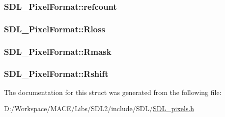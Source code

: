 \subsubsection[{\texorpdfstring{refcount}{refcount}}]{ S\+D\+L\+\_\+\+Pixel\+Format\+::refcount}\hypertarget{struct_s_d_l___pixel_format_a23be8060443d58064a720a4e2ef31729}{}\label{struct_s_d_l___pixel_format_a23be8060443d58064a720a4e2ef31729}
\subsubsection[{\texorpdfstring{Rloss}{Rloss}}]{ S\+D\+L\+\_\+\+Pixel\+Format\+::\+Rloss}\hypertarget{struct_s_d_l___pixel_format_a9994b4ed87a2551253aebfa191db8424}{}\label{struct_s_d_l___pixel_format_a9994b4ed87a2551253aebfa191db8424}
\subsubsection[{\texorpdfstring{Rmask}{Rmask}}]{ S\+D\+L\+\_\+\+Pixel\+Format\+::\+Rmask}\hypertarget{struct_s_d_l___pixel_format_a35e5793f6e9c356aec2d130167174946}{}\label{struct_s_d_l___pixel_format_a35e5793f6e9c356aec2d130167174946}
\subsubsection[{\texorpdfstring{Rshift}{Rshift}}]{ S\+D\+L\+\_\+\+Pixel\+Format\+::\+Rshift}\hypertarget{struct_s_d_l___pixel_format_abfdec7b9ee2ee39db630f4022e4e0daa}{}\label{struct_s_d_l___pixel_format_abfdec7b9ee2ee39db630f4022e4e0daa}


The documentation for this struct was generated from the following file\+:\begin{DoxyCompactItemize}
\item 
D\+:/\+Workspace/\+M\+A\+C\+E/\+Libs/\+S\+D\+L2/include/\+S\+D\+L/\hyperlink{_s_d_l__pixels_8h}{S\+D\+L\+\_\+pixels.\+h}\end{DoxyCompactItemize}
